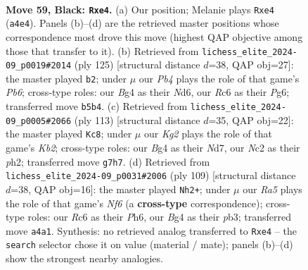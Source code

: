 \documentclass[11pt]{article}
\begin{document}
\clearpage

\begin{figure}[p]\centering
\begin{subfigure}{0.46\textwidth}\centering
\resizebox{\linewidth}{!}{%
\newchessgame
\chessboard[
  setfen={1R6/6k1/2r5/1p6/r3P1bB/6R1/2n2P2/7K b - - 1 59},
  showmover=false,
  pgfstyle=straightmove, color=movearrow, markmove={a4-e4}
]}
\caption{}
\end{subfigure}\hfill
\begin{subfigure}{0.46\textwidth}\centering
\resizebox{\linewidth}{!}{%
\newchessgame
\chessboard[
  setfen={3R4/8/1R1n2p1/p3k1P1/P7/1p3P1K/3r4/8 b - - 2 63},
  showmover=false,
  pgfstyle=straightmove, color=movearrow, markmove={b3-b2}
]}
\caption{}
\end{subfigure}
\\[4pt]
\begin{subfigure}{0.46\textwidth}\centering
\resizebox{\linewidth}{!}{%
\newchessgame
\chessboard[
  setfen={8/1k1n1R2/6R1/3r4/1p4p1/8/7P/2K5 b - - 10 57},
  showmover=false,
  pgfstyle=straightmove, color=movearrow, markmove={b7-c8}
]}
\caption{}
\end{subfigure}\hfill
\begin{subfigure}{0.46\textwidth}\centering
\resizebox{\linewidth}{!}{%
\newchessgame
\chessboard[
  setfen={R7/4k3/7p/8/1N6/pP3nPP/1r6/5K2 b - - 3 55},
  showmover=false,
  pgfstyle=straightmove, color=movearrow, markmove={f3-h2}
]}
\caption{}
\end{subfigure}
\caption{\textbf{Move 59, Black: \texttt{Rxe4}.} (a) Our position; Melanie plays \texttt{Rxe4} (\texttt{a4e4}). Panels (b)--(d) are the retrieved master positions whose correspondence most drove this move (highest QAP objective among those that transfer to it). (b) Retrieved from \texttt{lichess\_elite\_2024-09\_p0019\#2014} (ply 125) [structural distance $d$=38, QAP obj=27]: the master played \texttt{b2}; under $\mu$ our \emph{Pb4} plays the role of that game's \emph{Pb6}; cross-type roles: our \emph{B}g4 as their \emph{N}d6, our \emph{R}c6 as their \emph{P}g6; transferred move \texttt{b5b4}. (c) Retrieved from \texttt{lichess\_elite\_2024-09\_p0005\#2066} (ply 113) [structural distance $d$=35, QAP obj=22]: the master played \texttt{Kc8}; under $\mu$ our \emph{Kg2} plays the role of that game's \emph{Kb2}; cross-type roles: our \emph{B}g4 as their \emph{N}d7, our \emph{N}c2 as their \emph{p}h2; transferred move \texttt{g7h7}. (d) Retrieved from \texttt{lichess\_elite\_2024-09\_p0031\#2006} (ply 109) [structural distance $d$=38, QAP obj=16]: the master played \texttt{Nh2+}; under $\mu$ our \emph{Ra5} plays the role of that game's \emph{Nf6} (a \textbf{cross-type} correspondence); cross-type roles: our \emph{R}c6 as their \emph{P}h6, our \emph{B}g4 as their \emph{p}b3; transferred move \texttt{a4a1}. Synthesis: no retrieved analog transferred to \texttt{Rxe4} -- the \texttt{search} selector chose it on value (material / mate); panels (b)--(d) show the strongest nearby analogies.}
\label{fig:thought-m117}
\end{figure}
\end{document}
